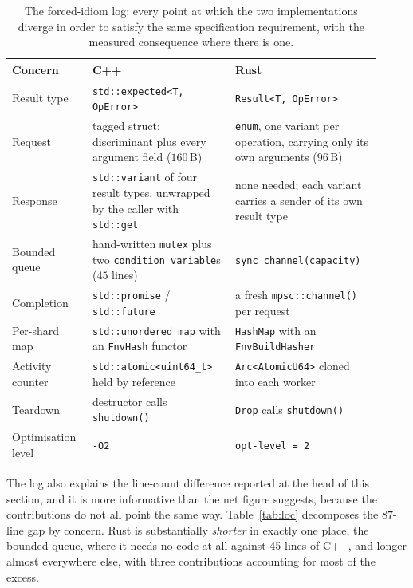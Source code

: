 \documentclass[english,twoside,openright,a4paper,censored,csm,software-track-2020]{HYthesisML}
\begin{document}
\begin{table}
\centering
\small
\caption{The forced-idiom log: every point at which the two implementations diverge in order
to satisfy the same specification requirement, with the measured consequence where there is
one.\label{tab:idioms}}
\begin{tabular}{@{}R{0.20\linewidth} R{0.36\linewidth} R{0.36\linewidth}@{}}
\hline\hline
Concern & C++ & Rust \\
\hline
Result type & \texttt{std::expected<T, OpError>} & \texttt{Result<T, OpError>} \\
Request & tagged struct: discriminant plus every argument field ($160$\,B) & \texttt{enum}, one variant per operation, carrying only its own arguments ($96$\,B) \\
Response & \texttt{std::variant} of four result types, unwrapped by the caller with \texttt{std::get} & none needed; each variant carries a sender of its own result type \\
Bounded queue & hand-written \texttt{mutex} plus two \texttt{condition\_variable}s ($45$ lines) & \texttt{sync\_channel(capacity)} \\
Completion & \texttt{std::promise} / \texttt{std::future} & a fresh \texttt{mpsc::channel()} per request \\
Per-shard map & \texttt{std::unordered\_map} with an \texttt{FnvHash} functor & \texttt{HashMap} with an \texttt{FnvBuildHasher} \\
Activity counter & \texttt{std::atomic<uint64\_t>} held by reference & \texttt{Arc<AtomicU64>} cloned into each worker \\
Teardown & destructor calls \texttt{shutdown()} & \texttt{Drop} calls \texttt{shutdown()} \\
Optimisation level & \texttt{-O2} & \texttt{opt-level = 2} \\
\hline
\end{tabular}
\end{table}

The log also explains the line-count difference reported at the head of this section, and it
is more informative than the net figure suggests, because the contributions do not all point
the same way. Table~\ref{tab:loc} decomposes the $87$-line gap by concern. Rust is
substantially \emph{shorter} in exactly one place, the bounded queue, where it needs no code
at all against 45 lines of C++, and longer almost everywhere else, with three contributions
accounting for most of the excess.
\end{document}
